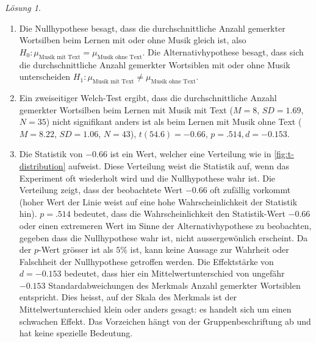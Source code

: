 \documentclass[
]{book}
\providecommand{\tightlist}{%
  \setlength{\itemsep}{0pt}\setlength{\parskip}{0pt}}
\theoremstyle{definition}
\theoremstyle{definition}
\theoremstyle{definition}
\theoremstyle{definition}
\theoremstyle{remark}
\newtheorem*{solution}{Lösung}
\begin{document}
\begin{solution}
\begin{enumerate}
\def\labelenumi{\alph{enumi})}
\tightlist
\item
  Die Nullhypothese besagt, dass die durchschnittliche Anzahl gemerkter Wortsilben beim Lernen mit oder ohne Musik gleich ist, also \(H_0: \mu_\text{Musik mit Text} = \mu_\text{Musik ohne Text}\). Die Alternativhypothese besagt, dass sich die durchschnittliche Anzahl gemerkter Wortsiblen mit oder ohne Musik unterscheiden \(H_1: \mu_\text{Musik mit Text} \neq \mu_\text{Musik ohne Text}\).
\item
  Ein zweiseitiger Welch-Test ergibt, dass die durchschnittliche Anzahl gemerkter Wortsilben beim Lernen mit Musik mit Text (\(M = 8\), \(SD = 1.69\), \(N = 35\)) nicht signifikant anders ist als beim Lernen mit Musik ohne Text (\(M = 8.22\), \(SD = 1.06\), \(N = 43\)), \(t(54.6) = -0.66\), \(p = .514, d = -0.153\).
\item
  Die Statistik von \(-0.66\) ist ein Wert, welcher eine Verteilung wie in \ref{fig:t-distribution} aufweist. Diese Verteilung weist die Statistik auf, wenn das Experiment oft wiederholt wird und die Nullhypothese wahr ist. Die Verteilung zeigt, dass der beobachtete Wert \(-0.66\) oft zufällig vorkommt (hoher Wert der Linie weist auf eine hohe Wahrscheinlichkeit der Statistik hin). \(p = .514\) bedeutet, dass die Wahrscheinlichkeit den Statistik-Wert \(-0.66\) oder einen extremeren Wert im Sinne der Alternativhypothese zu beobachten, gegeben dass die Nullhypothese wahr ist, nicht aussergewönlich erscheint. Da der \(p\)-Wert grösser ist als \(5\%\) ist, kann keine Aussage zur Wahrheit oder Falschheit der Nullhypothese getroffen werden. Die Effektstärke von \(d = -0.153\) bedeutet, dass hier ein Mittelwertunterschied von ungefähr \(-0.153\) Standardabweichungen des Merkmals Anzahl gemerkter Wortsiblen entspricht. Dies heisst, auf der Skala des Merkmals ist der Mittelwertunterschied klein oder anders gesagt: es handelt sich um einen schwachen Effekt. Das Vorzeichen hängt von der Gruppenbeschriftung ab und hat keine spezielle Bedeutung.
\end{enumerate}

\end{solution}
\end{document}
